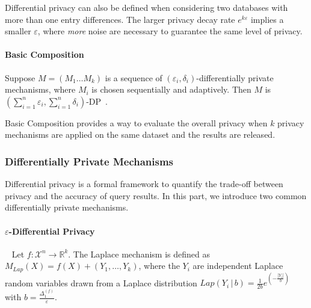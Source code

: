 Differential privacy can also be defined when considering two databases with more than one entry differences. The larger privacy decay rate $e^{k\varepsilon}$ implies a smaller $\varepsilon$, where \textit{more} noise are necessary to guarantee the same level of privacy.

\paragraph{Basic Composition}
\begin{theorem}
    Suppose $M=\left( M_{1}\ldots M_{k}\right)$  is a sequence of $\left( \varepsilon_{i} ,\delta_{i} \right)$-differentially private mechanisms, where $M_{i}$ is chosen sequentially and adaptively. Then $M$ is $\left(\sum_{i=1}^n\varepsilon_{i} ,\sum_{i=1}^n\delta_{i} \right)$-DP~\cite{dwork2014algorithmic}.
\end{theorem}

Basic Composition provides a way to evaluate the overall privacy when $k$ privacy mechanisms are applied on the same dataset and the results are released.

\subsubsection{Differentially Private Mechanisms}
\label{subsubsec:DPMechanisms}

Differential privacy is a formal framework to quantify the trade-off between privacy and the accuracy of query results. In this part, we introduce two common differentially private mechanisms.

\paragraph{$\varepsilon$-Differential Privacy}
\begin{definition}\
    \label{def:laplaceMechanism}
    Let $f : \mathcal{X}^{n} \rightarrow \mathbb{R}^{k}$. The Laplace mechanism is defined as $M_{Lap}\left( X\right) =f\left( X\right) +\left( Y_{1},\ldots ,Y_{k}\right) $, where the $Y_{i}$ are independent Laplace random variables drawn from a Laplace distribution $Lap \left(  Y_{i}\,|\, b\right) =\frac{1}{2b}e^{\left( -\frac{\left  | Y_{i}\right|}{b}\right)} $ with $b=\frac{\Delta _{1}^{\left(f\right)}}{\varepsilon }$.
\end{definition}


